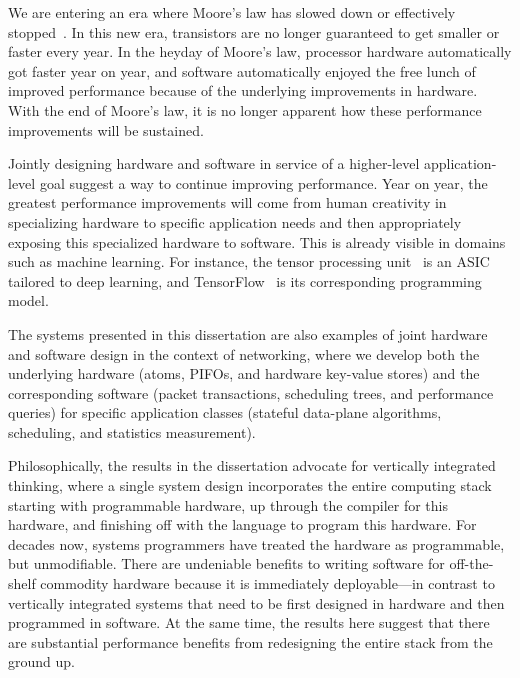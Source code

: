  We are entering an era where
Moore's law has slowed down or effectively stopped~\cite{dark_silicon,
four_horsemen}.  In this new era, transistors are no longer guaranteed to get
smaller or faster every year. In the heyday of Moore's law, processor hardware
automatically got faster year on year, and software automatically enjoyed the
free lunch of improved performance because of the underlying improvements in
hardware. With the end of Moore's law, it is no longer apparent how these
performance improvements will be sustained.

Jointly designing hardware and software in service of a higher-level
application-level goal suggest a way to continue improving performance. Year on
year, the greatest performance improvements will come from human creativity in
specializing hardware to specific application needs and then appropriately
exposing this specialized hardware to software. This is already visible in
domains such as machine learning. For instance, the tensor processing
unit~\cite{tpu} is an ASIC tailored to deep learning, and
TensorFlow~\cite{tensorflow} is its corresponding programming model.

The systems presented in this dissertation are also examples of joint hardware
and software design in the context of networking, where we develop both the
underlying hardware (atoms, PIFOs, and hardware key-value stores) and the
corresponding software (packet transactions, scheduling trees, and performance
queries) for specific application classes (stateful data-plane algorithms,
scheduling, and statistics measurement).

 Philosophically, the results in the
dissertation advocate for vertically integrated thinking, where a single system
design incorporates the entire computing stack starting with programmable
hardware, up through the compiler for this hardware, and finishing off with the
language to program this hardware. For decades now, systems programmers have
treated the hardware as programmable, but unmodifiable. There are undeniable
benefits to writing software for off-the-shelf commodity hardware because it is
immediately deployable---in contrast to vertically integrated systems that need
to be first designed in hardware and then programmed in software. At the same
time, the results here suggest that there are substantial performance benefits
from redesigning the entire stack from the ground up.
